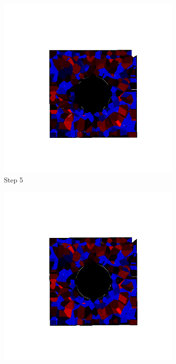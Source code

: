 \begin{figure}[ht!]
      \begin{subfigure}{.25\textwidth}
        \centering
        \includegraphics[width=1.0\linewidth]{Files/Small_DEF/IS/DEP5-STEP(005).png}
      \caption{Step 5}
      \end{subfigure}%
      \begin{subfigure}{.25\textwidth}
        \centering
        \includegraphics[width=1.0\linewidth]{Files/Small_DEF/IS/DEP5-STEP(006).png}

\end{subfigure}
\end{figure}
